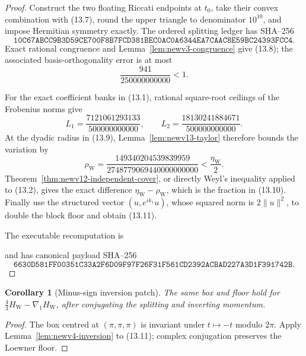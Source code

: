 \documentclass[11pt,oneside]{article}
\newtheorem{corollary}[theorem]{Corollary}
\theoremstyle{definition}
\theoremstyle{remark}
\begin{document}
\begin{proof}
Construct the two floating Riccati endpoints at \(t_0\), take their
convex combination with (13.7), round the upper triangle to
denominator \(10^{10}\), and impose Hermitian symmetry exactly.  The
ordered splitting ledger has SHA--256
\[
\texttt{10C67ABCC9B3D59CE700F8B7FCD381BEC0AC0A6344EA7CAAC8E59BC24393FCC4}.
                                                               \tag{13.12}
\]
Exact rational congruence and
Lemma~\ref{lem:newv3-congruence} give (13.8); the associated
basis-orthogonality error is at most
\[
 \frac{941}{250000000000}<1.                             \tag{13.13}
\]

For the exact coefficient banks in (13.1), rational square-root
ceilings of the Frobenius norms give
\[
 L_1=\frac{7121061293133}{500000000000},
 \qquad
 L_2=\frac{18130241884671}{500000000000}.                \tag{13.14}
\]
At the dyadic radius in (13.9), Lemma~\ref{lem:newv13-taylor}
therefore bounds the variation by
\[
 \rho_{\mathrm W}
 =
 \frac{149340204539839959}
 {2748779069440000000000}
 <\frac{\eta_{\mathrm W}}2.                              \tag{13.15}
\]
Theorem~\ref{thm:newv12-independent-cover}, or directly Weyl's
inequality applied to (13.2), gives the exact difference
\(\eta_{\mathrm W}-\rho_{\mathrm W}\), which is the fraction in
(13.10).  Finally use the structured vector
\((u,e^{ik_1}u)\), whose squared norm is \(2\|u\|^2\), to double the
block floor and obtain (13.11).

The executable recomputation is
\begin{center}
\footnotesize
{}
\end{center}
and has canonical payload SHA--256
\[
\texttt{6630D581FF00351C33A2F6D09F97F26F31F561CD2392ACBAD227A3D1F391742B}.
                                                               \tag{13.16}
\]
\end{proof}

\begin{corollary}[Minus-sign inversion patch]
\label{cor:newv13-minus}
The same box and floor hold for
\(\frac43H_{\mathrm W}-\nabla_1H_{\mathrm W}\), after conjugating the
splitting and inverting momentum.
\end{corollary}

\begin{proof}
The box centred at \((\pi,\pi,\pi)\) is invariant under
\(t\mapsto-t\) modulo \(2\pi\).  Apply
Lemma~\ref{lem:newv4-inversion} to (13.11); complex conjugation
preserves the Loewner floor.
\end{proof}
\end{document}

